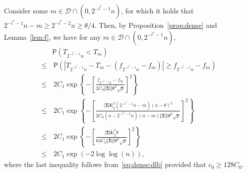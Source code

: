\documentclass[11pt, a4paper]{article}
\newcommand{\mc}{\mathcal}
\renewcommand{\l}{\left}
\renewcommand{\r}{\right}
\newcommand{\cp}{\theta}
\newcommand{\p}{\mathsf{P}}
\newcommand{\nn}{\nonumber}
\theoremstyle{definition}
\theoremstyle{definition}
\theoremstyle{definition}
\theoremstyle{definition}
\theoremstyle{definition}
\theoremstyle{remark}
\theoremstyle{definition}
\theoremstyle{definition}
\theoremstyle{definition}
\begin{document}
Consider some $m \in \mc D \cap (0, 2^{-l^* - 1}n)$, for which it holds that $2^{-l^* - 1}n - m \ge 2^{-l^* - 2}n \ge \cp/4$. %
Then, by Proposition~\ref{prop:dense} and Lemma~\ref{lem:f}, we have for any $m \in \mc D \cap (0, 2^{-l^* - 1}n)$,
\begin{align}
& \p\l( T_{2^{-l^* - 1}n} < T_m \r)
\nn \\
\le & \, \p\l( \l\vert T_{2^{-l^* - 1}n} - T_m - (f_{2^{-l^* - 1}n} - f_m) \r\vert \ge f_{2^{-l^* - 1}n} - f_m \r)
\nn \\
\le & \, 2 C_1 \exp\l\{ - \l[ \frac{ f_{2^{-l^* - 1}n} - f_m }{2 C_0 \Vert \bm\Sigma \Vert \Psi^2 \sqrt{p}} \r]^2 \r\}
\nn \\
\le & \, 2 C_1 \exp\l\{ - \l[ 
\frac{\vert \bm\Sigma \bm\delta \vert_2^2 (2^{-l^*-1}n - m) (n - \cp)^2}{2 C_0 (n - 2^{-l^*-1}n)(n - m) \Vert \bm\Sigma \Vert \Psi^2 \sqrt{p}}
\r]^2 \r\} %
\nn \\
\le & \, 2 C_1 \exp\l\{ - \l[ 
\frac{\vert \bm\Sigma \bm\delta \vert_2^2 \cp}{64 C_0 \Vert \bm\Sigma \Vert \Psi^2 \sqrt{p}} \r]^2 \r\} 
\nn \\
\le & \, 2 C_1 \exp( - 2 \log\log(n)),
\label{eq:thm:qcscan:one}
\end{align}
where the last inequality follows from~\eqref{eq:dense:dlb} provided that $c_0 \ge 128 C_0$.
\end{document}
